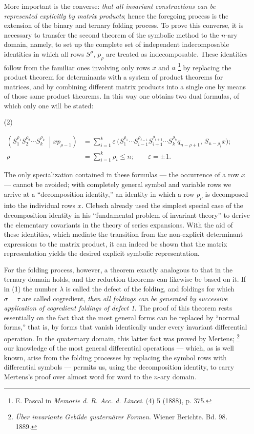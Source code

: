\documentclass[11pt]{article}
\newcommand{\NoetherSrcNote}[2]{%
  \begingroup
  \renewcommand{\thefootnote}{[#1]}%
  \footnote{#2}%
  \endgroup
}
\providecommand{\srcnumdisplay}[3][3.2em]{%
  \par\smallskip\noindent
  \begin{minipage}[t]{#1}\vspace*{0pt}#2\end{minipage}%
  \begin{minipage}[t]{\dimexpr\linewidth-#1\relax}\vspace*{0pt}\centering
  \(\displaystyle #3\)
  \end{minipage}\par\smallskip}
\begin{document}
More important is the converse: \emph{that all invariant constructions can be represented explicitly by matrix products}; hence the foregoing process is the extension of the binary and ternary folding process. To prove this converse, it is necessary to transfer the second theorem of the symbolic method to the $n$-ary domain, namely, to set up the complete set of independent indecomposable identities in which all rows $S^\rho$, $p_\rho$ are treated as indecomposable. These identities follow from the familiar ones involving only rows $x$ and $u$\NoetherSrcNote{103:2}{E. Pascal in \emph{Memorie d. R. Acc. d. Lincei}. (4) 5 (1888), p. 375.} by replacing the product theorem for determinants with a system of product theorems for matrices, and by combining different matrix products into a single one by means of those same product theorems. In this way one obtains two dual formulas, of which only one will be stated:
\srcnumdisplay{(2)}{%
\begin{aligned}
 \left(S_1^{\rho_1}S_2^{\rho_2}\cdots S_k^{\rho_k}\,\middle|\,x p_{\rho-1}\right)
 &=\sum_{i=1}^{k}\varepsilon\,\bigl(S_1^{\rho_1}\cdots S_{i-1}^{\rho_{i-1}}S_{i+1}^{\rho_{i+1}}\cdots S_k^{\rho_k}q_{n-\rho+1},\,S_{n-\rho_i}x\bigr);\\
 \rho&=\sum_{i=1}^{k}\rho_i\le n;\qquad \varepsilon=\pm1.
\end{aligned}}

The only specialization contained in these formulas --- the occurrence of a row $x$ --- cannot be avoided; with completely general symbol and variable rows we arrive at a ``decomposition identity,'' an identity in which a row $p_\rho$ is decomposed into the individual rows $x$. Clebsch already used the simplest special case of the decomposition identity in his ``fundamental problem of invariant theory'' to derive the elementary covariants in the theory of series expansions. With the aid of these identities, which mediate the transition from the non-explicit determinant expressions to the matrix product, it can indeed be shown that the matrix representation yields the desired explicit symbolic representation.

For the folding process, however, a theorem exactly analogous to that in the ternary domain holds, and the reduction theorems can likewise be based on it. If in (1) the number $\lambda$ is called the defect of the folding, and foldings for which $\sigma=\tau$ are called cogredient, \emph{then all foldings can be generated by successive application of cogredient foldings of defect 1}. The proof of this theorem rests essentially on the fact that the most general forms can be replaced by ``normal forms,'' that is, by forms that vanish identically under every invariant differential operation. In the quaternary domain, this latter fact was proved by Mertens;\NoetherSrcNote{104:1}{\emph{Über invariante Gebilde quaternärer Formen}. Wiener Berichte. Bd. 98. 1889.} our knowledge of the most general differential operations --- which, as is well known, arise from the folding processes by replacing the symbol rows with differential symbols --- permits us, using the decomposition identity, to carry Mertens's proof over almost word for word to the $n$-ary domain.
\end{document}
